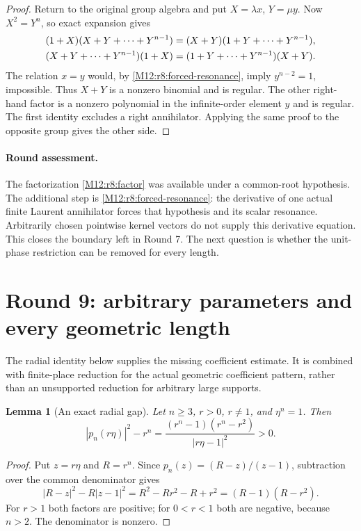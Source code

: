 \documentclass[11pt,a4paper,oneside]{report}
\newtheorem{lemma}[theorem]{Lemma}
\theoremstyle{definition}
\theoremstyle{remark}
\begin{document}
\begin{proof}
Return to the original group algebra and put $X=\lambda x$,
$Y=\mu y$. Now $X^2=Y^n$, so exact expansion gives
\begin{align}
 (1+X)(X+Y+\cdots+Y^{n-1})
   &=(X+Y)(1+Y+\cdots+Y^{n-1}),\label{M12:r8:factor}\\
 (X+Y+\cdots+Y^{n-1})(1+X)
   &=(1+Y+\cdots+Y^{n-1})(X+Y).\notag
\end{align}
The relation $x=y$ would, by \eqref{M12:r8:forced-resonance}, imply
$y^{n-2}=1$, impossible. Thus $X+Y$ is a nonzero binomial and
is regular. The other right-hand factor is a nonzero polynomial
in the infinite-order element $y$ and is regular. The first
identity excludes a right annihilator. Applying the same proof
to the opposite group gives the other side.
\end{proof}

\paragraph{Round assessment.}
The factorization \eqref{M12:r8:factor} was available under a common-root
hypothesis. The additional step is \eqref{M12:r8:forced-resonance}:
the derivative of one actual finite Laurent annihilator forces that
hypothesis and its scalar resonance. Arbitrarily chosen pointwise
kernel vectors do not supply this derivative equation. This closes
the boundary left in Round 7. The next question is whether the
unit-phase restriction can be removed for every length.

\section{Round 9: arbitrary parameters and every geometric length}
\label{M12:r9:section}

The radial identity below supplies the missing coefficient estimate.
It is combined with finite-place reduction for the actual geometric
coefficient pattern, rather than an unsupported reduction for
arbitrary large supports.

\begin{lemma}[An exact radial gap]\label{M12:r9:radial}
Let $n\ge3$, $r>0$, $r\ne1$, and $\eta^n=1$. Then
\begin{equation}\label{M12:r9:identity}
 |p_n(r\eta)|^2-r^n
 =\frac{(r^n-1)(r^n-r^2)}{|r\eta-1|^2}>0.
\end{equation}
\end{lemma}
\begin{proof}
Put $z=r\eta$ and $R=r^n$. Since
$p_n(z)=(R-z)/(z-1)$, subtraction over the common denominator gives
\[
 |R-z|^2-R|z-1|^2
 =R^2-Rr^2-R+r^2=(R-1)(R-r^2).
\]
For $r>1$ both factors are positive; for $0<r<1$ both are negative,
because $n>2$. The denominator is nonzero.
\end{proof}
\end{document}
